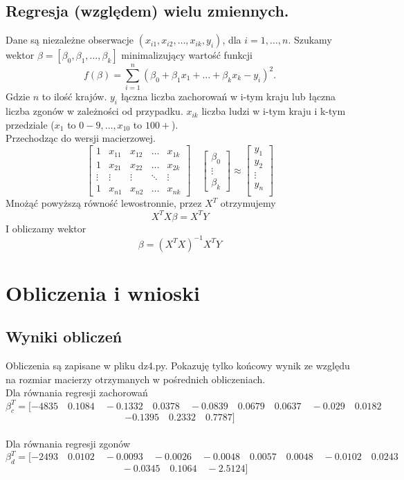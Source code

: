 \documentclass[12pt]{article}
\begin{document}
\subsection*{Regresja (względem) wielu zmiennych.}
Dane są niezależne obserwacje $(x_{i1},x_{i2},\ldots,x_{ik},y_{i})$, dla $i = 1,\ldots,n$.
Szukamy wektor $\beta=[\beta_{0},\beta_{1},\ldots,\beta_{k}]$ minimalizujący wartość funkcji
$$ f(\beta)=\sum_{i=1}^{n}
(\beta_{0}+\beta_{1}x_1+\ldots+\beta_{k}x_k-y_i)^2.$$
Gdzie $n$ to ilość krajów. $y_i$ łączna liczba zachorowań w i-tym kraju lub łączna liczba zgonów w zależności od przypadku. $x_{ik}$ liczba ludzi w i-tym kraju i k-tym przedziale ($x_1$ to $0-9,\ldots, x_{10}$ to $100+$).\\
Przechodząc do wersji macierzowej.
$$
\left[ \begin{array}{ccccc}
1 & x_{11} & x_{12} & \ldots & x_{1k}\\
1 & x_{21} & x_{22} & \ldots & x_{2k}\\
\vdots & \vdots & \vdots & \ddots & \vdots \\
1 & x_{n1} & x_{n2} & \ldots & x_{nk}
\end{array} \right]
\quad
\left[ \begin{array}{c}
\beta_0\\
\vdots \\
\beta_k
\end{array} \right]
\approx
\left[ \begin{array}{c}
y_1\\
y_2\\
\vdots \\
y_n\\
\end{array} \right]
$$
Mnożąć powyższą równość lewostronnie, przez $X^T$ otrzymujemy
$$ X^TX\beta=X^TY$$
I obliczamy wektor
$$ \beta=( X^TX)^{-1}X^TY $$

\section*{Obliczenia i wnioski}
\subsection*{Wyniki obliczeń}
Obliczenia są zapisane w pliku dz4.py. Pokazuję tylko końcowy wynik ze względu na rozmiar macierzy otrzymanych w pośrednich obliczeniach. \\
Dla równania regresji zachorowań 
$$ \beta_c^T = [-4835\quad 0.1084 \quad  -0.1332\quad 0.0378\quad  -0.0839\quad 0.0679\quad 0.0637\quad -0.029\quad 0.0182\quad $$ 
$$-0.1395\quad 0.2332 \quad 0.7787 ] $$
\\
Dla równania regresji zgonów 
$$ \beta_d^T = [-2493\quad 0.0102\quad -0.0093 \quad -0.0026 \quad  -0.0048 \quad 0.0057 \quad  0.0048 \quad  -0.0102 \quad  0.0243 $$
$$\quad -0.0345 \quad 0.1064 \quad -2.5124 ] $$
\cleardoublepage
\end{document}
